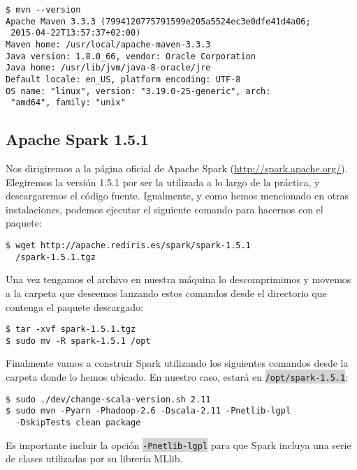 \begin{lstlisting}
$ mvn --version
Apache Maven 3.3.3 (7994120775791599e205a5524ec3e0dfe41d4a06;
 2015-04-22T13:57:37+02:00)
Maven home: /usr/local/apache-maven-3.3.3
Java version: 1.8.0_66, vendor: Oracle Corporation
Java home: /usr/lib/jvm/java-8-oracle/jre
Default locale: en_US, platform encoding: UTF-8
OS name: "linux", version: "3.19.0-25-generic", arch:
 "amd64", family: "unix"
\end{lstlisting}


\subsection{Apache Spark 1.5.1}

Nos dirigiremos a la página oficial de Apache Spark (\url{http://spark.apache.org/}). Elegiremos la versión 1.5.1 por ser la utilizada a lo largo de la práctica, y descargaremos el código fuente. Igualmente, y como hemos mencionado en otras instalaciones, podemos ejecutar el siguiente comando para hacernos con el paquete:

\begin{lstlisting}
$ wget http://apache.rediris.es/spark/spark-1.5.1
  /spark-1.5.1.tgz
\end{lstlisting}


Una vez tengamos el archivo en nuestra máquina lo descomprimimos y movemos a la carpeta que deseemos lanzando estos comandos desde el directorio que contenga el paquete descargado:

\begin{lstlisting}
$ tar -xvf spark-1.5.1.tgz
$ sudo mv -R spark-1.5.1 /opt
\end{lstlisting}

Finalmente vamos a construir Spark utilizando los siguientes comandos desde la carpeta donde lo hemos ubicado. En nuestro caso, estará en \colorbox{lightgray}{\lstinline|/opt/spark-1.5.1|}:

\begin{lstlisting}
$ sudo ./dev/change-scala-version.sh 2.11
$ sudo mvn -Pyarn -Phadoop-2.6 -Dscala-2.11 -Pnetlib-lgpl
  -DskipTests clean package
\end{lstlisting}

Es importante incluir la opción \colorbox{lightgray}{\lstinline|-Pnetlib-lgpl|} para que Spark incluya una serie de clases utilizadas por su librería MLlib\cite{SparkDependencies}.


